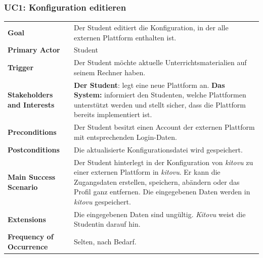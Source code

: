 \documentclass[a4paper]{article}
\begin{document}
\subsubsection{UC1: Konfiguration editieren}
\begin{tabulary}{\linewidth}{lp{30em}}
	\textbf{Goal} & Der Student editiert die Konfiguration, in der alle externen Plattform enthalten ist. \\
	\textbf{Primary Actor} & Student\\
	\textbf{Trigger} & Der Student möchte aktuelle Unterrichtsmaterialien auf seinem Rechner haben. \\
	\textbf{Stakeholders and Interests} & \textbf{Der Student}: legt eine neue Plattform an. \textbf{Das System:} informiert den Studenten, welche Plattformen unterstützt werden und stellt sicher, dass die Plattform bereits implementiert ist. \\
	\textbf{Preconditions} & Der Student besitzt einen Account der externen Plattform mit entsprechenden Login-Daten.\\
	\textbf{Postconditions} & Die aktualisierte Konfigurationsdatei wird gespeichert. \\
	\textbf{Main Success Scenario} & Der Student hinterlegt in der Konfiguration von \emph{kitovu} zu einer externen Plattform in \emph{kitovu}. Er kann die Zugangsdaten erstellen, speichern, abändern oder das Profil ganz entfernen. Die eingegebenen Daten werden in \emph{kitovu} gespeichert. \\
	\textbf{Extensions} & Die eingegebenen Daten sind ungültig. \emph{Kitovu} weist die Studentin darauf hin.\\
	\textbf{Frequency of Occurrence} & Selten, nach Bedarf. \\
\end{tabulary}
\end{document}
